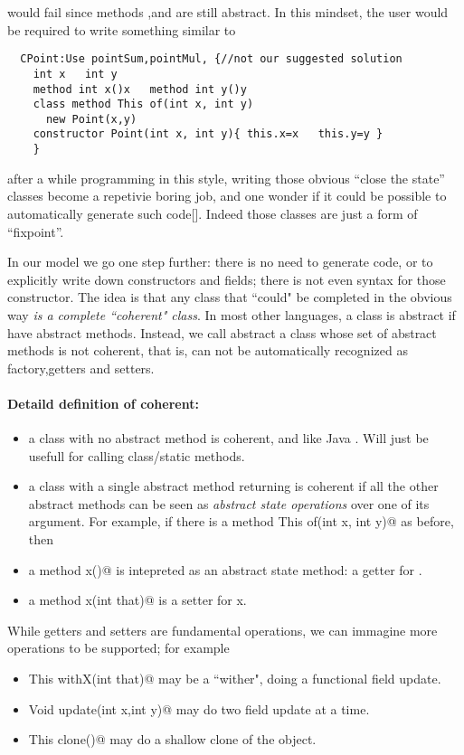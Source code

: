 \noindent would fail since methods \Q@x@,\Q@y@ and \Q@of@ are still abstract.
In this mindset, the user would be required to write something similar to

\begin{lstlisting}
  CPoint:Use pointSum,pointMul, {//not our suggested solution
    int x   int y
    method int x()x   method int y()y
    class method This of(int x, int y)
      new Point(x,y)
    constructor Point(int x, int y){ this.x=x   this.y=y }
    }
\end{lstlisting}

\noindent after a while programming in this style, 
writing those obvious ``close the state'' classes become a
repetivie boring job, and one wonder
if it could be possible to automatically generate such code[].
Indeed those classes are just a form of ``fixpoint''.

In our model we go one step further: there is no need to generate code, or to explicitly
write down constructors and fields; there is not even syntax for those
constructor.
The idea is that any class that ``could" be completed in the obvious way
\emph{is a complete ``coherent" class}.
In most other languages, a class is abstract if have abstract methods.
Instead, we call abstract a class whose set of abstract methods is not
coherent, that is, can not be automatically recognized as factory,getters and setters.
  
\paragraph*{Detaild definition of coherent:}
\begin{itemize}
\item a class with no abstract method is coherent, and like Java \Q@Math@.
Will just be usefull for calling class/static methods.
\item a class with a single abstract \Q@class@ method returning \Q@This@
is coherent if all the other abstract methods can be seen as \emph{abstract state
operations} over one of its argument.
For example,
if there is a \Q@class method This of(int x, int y)@ as before,
then
\item a method \Q@int x()@ is intepreted as an abstract state method: a getter for \Q@x@.
\item a method \Q@Void x(int that)@ is a setter for x.
\end{itemize}

While getters and setters are fundamental operations, we can immagine
more operations to be supported; for example
\begin{itemize}
\item \Q@method This withX(int that)@
may be a ``wither", doing a functional field update.
\item \Q@method Void update(int x,int y)@
may do two field update at a time.
\item\Q@method This clone()@ may do a shallow clone of the object.
\end{itemize}

